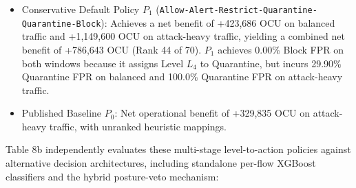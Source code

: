 \documentclass[journal,10pt,onecolumn]{IEEEtran}
\begin{document}
\begin{itemize}
  \item Conservative Default Policy $P_1$ (\texttt{Allow-Alert-Restrict-Quarantine-Quarantine-Block}): Achieves a net benefit of +423,686 OCU on balanced traffic and +1,149,600 OCU on attack-heavy traffic, yielding a combined net benefit of +786,643 OCU (Rank 44 of 70). $P_1$ achieves 0.00\% Block FPR on both windows because it assigns Level $L_4$ to Quarantine, but incurs 29.90\% Quarantine FPR on balanced and 100.0\% Quarantine FPR on attack-heavy traffic.
  \item Published Baseline $P_0$: Net operational benefit of +329,835 OCU on attack-heavy traffic, with unranked heuristic mappings.
\end{itemize}

Table 8b independently evaluates these multi-stage level-to-action policies against alternative decision architectures, including standalone per-flow XGBoost classifiers and the hybrid posture-veto mechanism:
\end{document}

